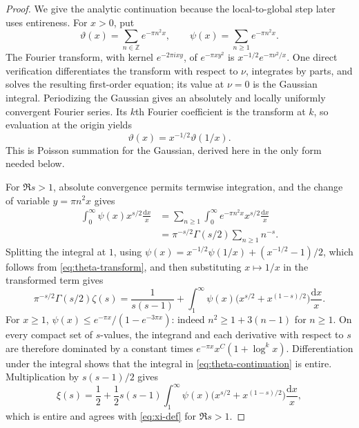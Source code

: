 \documentclass[11pt]{article}
\numberwithin{equation}{section}
\theoremstyle{definition}
\theoremstyle{remark}
\newcommand{\dd}{\mathrm d}
\begin{document}
\begin{proof}
We give the analytic continuation because the local-to-global step later uses entireness.  For
$x>0$, put
\[
 \vartheta(x)=\sum_{n\in\mathbb Z}e^{-\pi n^2x},
 \qquad
 \psi(x)=\sum_{n\geq1}e^{-\pi n^2x}.
\]
The Fourier transform, with kernel $e^{-2\pi ixy}$, of $e^{-\pi x y^2}$ is
$x^{-1/2}e^{-\pi \nu^2/x}$.  One direct verification differentiates the transform with respect to
$\nu$, integrates by parts, and solves the resulting first-order equation; its value at $\nu=0$
is the Gaussian integral.  Periodizing the Gaussian gives an absolutely and locally uniformly
convergent Fourier series.  Its $k$th Fourier coefficient is the transform at $k$, so evaluation
at the origin yields
\begin{equation}
 \vartheta(x)=x^{-1/2}\vartheta(1/x).
 \label{eq:theta-transform}
\end{equation}
This is Poisson summation for the Gaussian, derived here in the only form needed below.

For $\Re s>1$, absolute convergence permits termwise integration, and the change of variable
$y=\pi n^2x$ gives
\begin{align*}
 \int_0^\infty\psi(x)x^{s/2}\frac{\dd x}{x}
 &=\sum_{n\geq1}\int_0^\infty e^{-\pi n^2x}x^{s/2}\frac{\dd x}{x}\\
 &=\pi^{-s/2}\Gamma(s/2)\sum_{n\geq1}n^{-s}.
\end{align*}
Splitting the integral at $1$, using
$\psi(x)=x^{-1/2}\psi(1/x)+(x^{-1/2}-1)/2$, which follows from
\eqref{eq:theta-transform}, and then substituting $x\mapsto1/x$ in the transformed term gives
\begin{equation}
 \pi^{-s/2}\Gamma(s/2)\zeta(s)
 =\frac{1}{s(s-1)}+
  \int_1^\infty\psi(x)
   \bigl(x^{s/2}+x^{(1-s)/2}\bigr)\frac{\dd x}{x}.
 \label{eq:theta-continuation}
\end{equation}
For $x\geq1$,
$\psi(x)\leq e^{-\pi x}/(1-e^{-3\pi x})$: indeed $n^2\geq1+3(n-1)$ for $n\geq1$.
On every compact set of $s$-values, the integrand and each derivative with respect to $s$ are
therefore dominated by a constant times
$e^{-\pi x}x^C(1+\log^k x)$.  Differentiation under the integral shows that the integral in
\eqref{eq:theta-continuation} is entire.  Multiplication by $s(s-1)/2$ gives
\[
 \xi(s)=\frac12+\frac12s(s-1)
 \int_1^\infty\psi(x)
   \bigl(x^{s/2}+x^{(1-s)/2}\bigr)\frac{\dd x}{x},
\]
which is entire and agrees with \eqref{eq:xi-def} for $\Re s>1$.


\end{proof}
\end{document}
